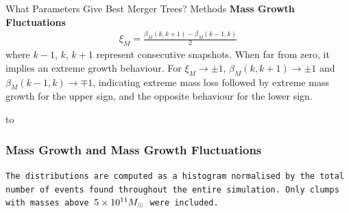 \begin{frame}{What Parameters Give Best Merger Trees? Methods}
    \textbf{Mass Growth Fluctuations}
        \begin{align}
            \xi_M = \frac{\beta_M(k, k+1) - \beta_M(k-1, k)}{2}
        \end{align}
        where $k-1$, $k$, $k+1$ represent consecutive snapshots.
        When far from zero, it implies an extreme growth behaviour. 
        For $\xi_M\rightarrow \pm 1$, $\beta_M(k, k+1) \rightarrow \pm 1$ and $\beta_M(k-1, k) \rightarrow \mp 1$, indicating extreme mass loss followed by extreme mass growth for the upper sign, and the opposite behaviour for the lower sign.

    
    
\end{frame}






{
    {\vbox to }
    \begin{frame}
        \frametitle{Mass Growth and Mass Growth Fluctuations}
        \vspace{7cm}
        \small\texttt{The distributions are computed as a histogram normalised by the total number of events found throughout the entire simulation.
            Only clumps with masses above $5\times 10^{11} M_\odot$ were included.
        }
    \end{frame}
}
